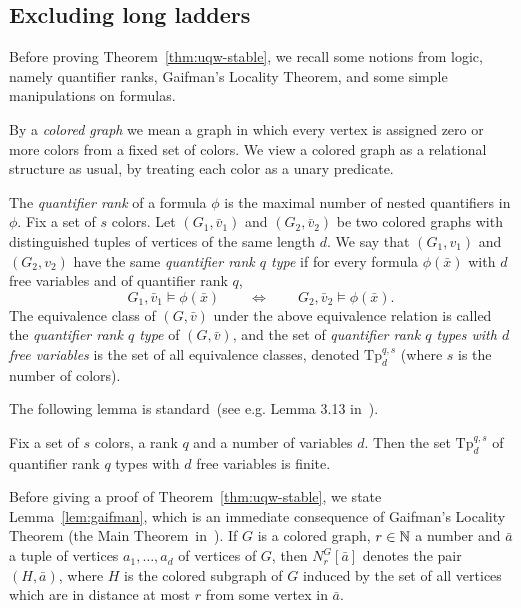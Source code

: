 \subsection{Excluding long ladders}
\label{sec:uqw-stable}

Before  proving Theorem~\ref{thm:uqw-stable}, we recall some notions from logic, namely quantifier ranks, Gaifman's Locality Theorem, and some simple manipulations on formulas.


By a \emph{colored graph} we mean a graph  in which 
every vertex is assigned zero or more colors from a fixed set of colors. We view a colored graph as a relational structure as usual, by treating each color as a unary predicate. 

The \emph{quantifier rank} of a formula $\phi$ is the maximal number of nested quantifiers in $\phi$. Fix a set of $s$ colors.
Let $(G_1,\bar v_1)$ and $(G_2,\bar v_2)$ be two
colored graphs with distinguished tuples of vertices of the same length $d$. We say that $(G_1,v_1)$ and $(G_2,v_2)$
have the same \emph{quantifier rank $q$ type}
if for every formula $\phi(\bar x)$ with $d$ free variables and of quantifier rank $q$,
 $$G_1,\bar v_1\models \phi(\bar x)\qquad\iff \qquad G_2,\bar v_2\models \phi(\bar x).$$
 The equivalence class of $(G,\bar v)$ under the above equivalence relation is called the \emph{quantifier rank $q$ type} of $(G,\bar v)$, and  the set of \emph{quantifier rank $q$ types with $d$ free variables}
is the set of all equivalence classes, denoted
$\mathrm{Tp}^{q,s}_d$ (where $s$ is the number of colors).

The following lemma is standard~(see e.g. Lemma 3.13 in~\cite{libkin}).
\begin{lemma}\label{lem:q-types}
	Fix a set of $s$ colors, a rank $q$ and a number of variables $d$.
	Then the set $\mathrm{Tp}^{q,s}_d$ of quantifier rank $q$ types with $d$ free variables is finite.
\end{lemma}


Before giving a proof of Theorem~\ref{thm:uqw-stable},
we state Lemma~\ref{lem:gaifman}, which is an
immediate consequence of Gaifman's Locality Theorem
(the Main Theorem~in~\cite{gaifman1982local}).
 If $G$ is a colored graph, $r\in\mathbb{N}$  a number and $\bar a$ a tuple of vertices $a_1,\ldots,a_d$  of vertices of $G$, then  $N^G_r[\bar a]$ denotes the pair $(H,\bar a)$, where $H$ is the colored subgraph of $G$
induced by the set of all vertices which are in distance at most $r$
from some vertex in $\bar a$.


